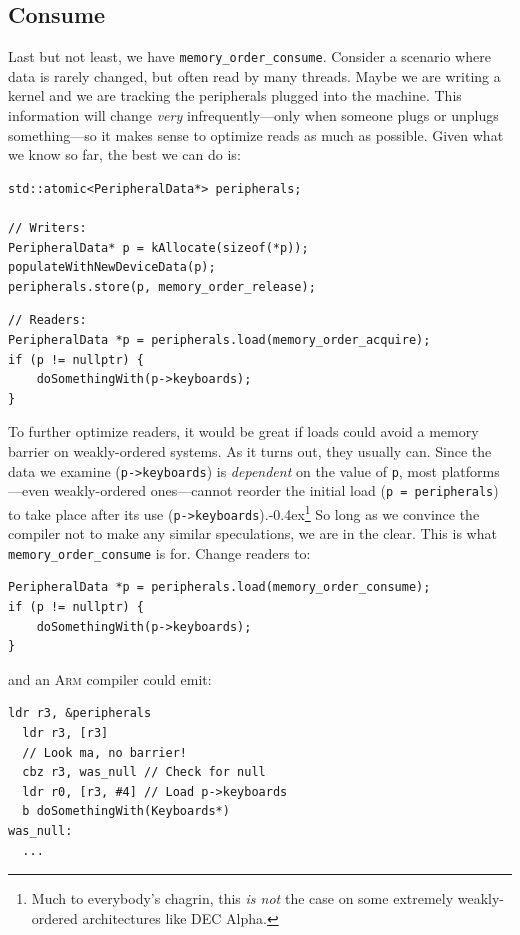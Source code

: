 \documentclass[fontsize=10pt, oneside]{scrartcl}
\newcommand{\codesize}{\fontsize{\bodyfontsize}{\bodybaselineskip}}
\newcommand{\punckern}{\kern-0.4ex}
\newcommand{\monobox}[1]{\mbox{\texttt{#1}}}
\newenvironment{colfigure}
  {\par\vspace{1\baselineskip minus 0.5\baselineskip}\noindent\minipage{\linewidth}}
  {\endminipage\vspace{1\baselineskip minus 0.7\baselineskip}}
\begin{document}
\subsection{Consume}

Last but not least, we have \texttt{memory\_order\_consume}.
Consider a scenario where data is rarely changed,
but often read by many threads.
Maybe we are writing a kernel
and we are tracking the peripherals plugged into the machine.
This information will change \emph{very} infrequently---only when someone plugs or unplugs something---so it makes sense to optimize reads as much as
possible.
Given what we know so far, the best we can do is:
\begin{colfigure}
\begin{verbatim}
std::atomic<PeripheralData*> peripherals;

// Writers:
PeripheralData* p = kAllocate(sizeof(*p));
populateWithNewDeviceData(p);
peripherals.store(p, memory_order_release);
\end{verbatim}
\begin{verbatim}
// Readers:
PeripheralData *p = peripherals.load(memory_order_acquire);
if (p != nullptr) {
    doSomethingWith(p->keyboards);
}
\end{verbatim}
\end{colfigure}

To further optimize readers,
it would be great if loads could avoid a memory barrier on weakly-ordered systems.
As it turns out, they usually can.
Since the data we examine (\texttt{p->keyboards})
is \emph{dependent} on the value of \texttt{p},
most platforms---even weakly-ordered ones---cannot reorder the initial load (\texttt{p = peripherals}) to take place after its use
(\texttt{p->keyboards}).\punckern\footnote{Much to everybody's chagrin,
this \emph{is not} the case on some extremely weakly-ordered architectures like DEC Alpha.}
So long as we convince the compiler not to make any similar speculations,
we are in the clear.
This is what \monobox{memory\_order\_consume} is for.
Change readers to:
\begin{colfigure}
\begin{verbatim}
PeripheralData *p = peripherals.load(memory_order_consume);
if (p != nullptr) {
    doSomethingWith(p->keyboards);
}
\end{verbatim}
\end{colfigure}
and an \textsc{Arm} compiler could emit:
\begin{colfigure}
\begin{lstlisting}[language={[ARM]Assembler}]
  ldr r3, &peripherals
  ldr r3, [r3]
  // Look ma, no barrier!
  cbz r3, was_null // Check for null
  ldr r0, [r3, #4] // Load p->keyboards
  b doSomethingWith(Keyboards*)
was_null:
  ...
\end{lstlisting}
\end{colfigure}
\end{document}
